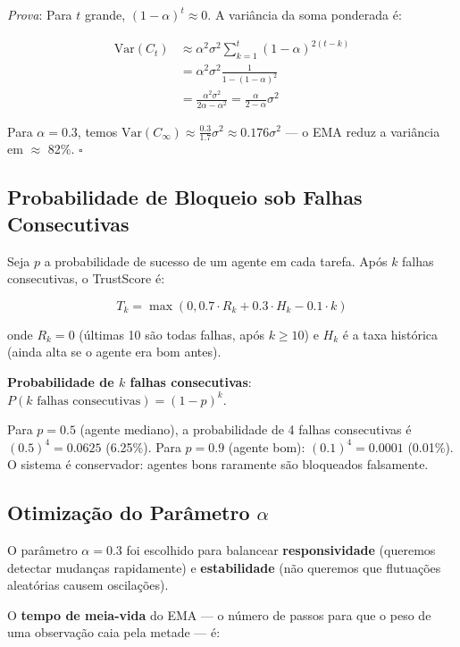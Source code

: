 \textit{Prova}: Para $t$ grande, $(1-\alpha)^t \approx 0$. A variância da soma ponderada é:

\begin{align}
\text{Var}(C_t) &\approx \alpha^2 \sigma^2 \sum_{k=1}^{t} (1-\alpha)^{2(t-k)} \\
&= \alpha^2 \sigma^2 \frac{1}{1 - (1-\alpha)^2} \\
&= \frac{\alpha^2 \sigma^2}{2\alpha - \alpha^2} = \frac{\alpha}{2-\alpha} \sigma^2
\end{align}

Para $\alpha = 0.3$, temos $\text{Var}(C_\infty) \approx \frac{0.3}{1.7} \sigma^2 \approx 0.176 \sigma^2$ — o EMA reduz a variância em $\approx$ 82\%. $\square$

\subsection{Probabilidade de Bloqueio sob Falhas Consecutivas}

Seja $p$ a probabilidade de sucesso de um agente em cada tarefa. Após $k$ falhas consecutivas, o TrustScore é:

\begin{equation}
T_k = \max(0, 0.7 \cdot R_k + 0.3 \cdot H_k - 0.1 \cdot k)
\label{eq:trust-after-failures}
\end{equation}

onde $R_k = 0$ (últimas 10 são todas falhas, após $k \geq 10$) e $H_k$ é a taxa histórica (ainda alta se o agente era bom antes).

\textbf{Probabilidade de $k$ falhas consecutivas}: $P(k \text{ falhas consecutivas}) = (1-p)^k$.

Para $p = 0.5$ (agente mediano), a probabilidade de 4 falhas consecutivas é $(0.5)^4 = 0.0625$ (6.25\%). Para $p = 0.9$ (agente bom): $(0.1)^4 = 0.0001$ (0.01\%). O sistema é conservador: agentes bons raramente são bloqueados falsamente.

\subsection{Otimização do Parâmetro $\alpha$}

O parâmetro $\alpha = 0.3$ foi escolhido para balancear \textbf{responsividade} (queremos detectar mudanças rapidamente) e \textbf{estabilidade} (não queremos que flutuações aleatórias causem oscilações).

O \textbf{tempo de meia-vida} do EMA — o número de passos para que o peso de uma observação caia pela metade — é:

